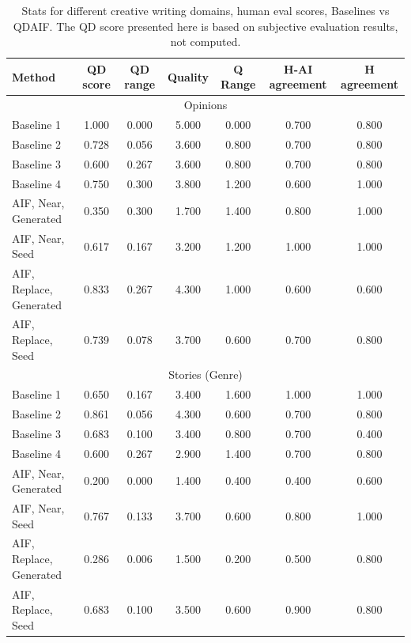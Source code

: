 \begin{table}[!t]
\caption{ Stats for different creative writing domains, human eval scores, Baselines vs QDAIF. The QD score presented here is based on subjective evaluation results, not computed. }
\label{table:human_eval_baselines_vs_aif}
\centering
\small
\begin{tabular}{lcccccc}
\toprule
\textbf{Method} &
\textbf{QD score} & \textbf{QD range} & \textbf{Quality} & \textbf{Q Range} & \textbf{H-AI agreement} & \textbf{H agreement }  \\
\midrule
\multicolumn{7}{c}{Opinions} \\
\midrule
Baseline 1 & 1.000 & 0.000 & 5.000 & 0.000 & 0.700 & 0.800  \\ 
Baseline 2 & 0.728 & 0.056 & 3.600 & 0.800 & 0.700 & 0.800  \\ 
Baseline 3 & 0.600 & 0.267 & 3.600 & 0.800 & 0.700 & 0.800  \\ 
Baseline 4 & 0.750 & 0.300 & 3.800 & 1.200 & 0.600 & 1.000  \\ 
AIF, Near, Generated & 0.350 & 0.300 & 1.700 & 1.400 & 0.800 & 1.000  \\ 
AIF, Near, Seed & 0.617 & 0.167 & 3.200 & 1.200 & 1.000 & 1.000  \\ 
AIF, Replace, Generated & 0.833 & 0.267 & 4.300 & 1.000 & 0.600 & 0.600  \\ 
AIF, Replace, Seed & 0.739 & 0.078 & 3.700 & 0.600 & 0.700 & 0.800 \\ 
\midrule
\multicolumn{7}{c}{Stories (Genre)} \\
\midrule
Baseline 1 & 0.650 & 0.167 & 3.400 & 1.600 & 1.000 & 1.000  \\ 
Baseline 2 & 0.861 & 0.056 & 4.300 & 0.600 & 0.700 & 0.800  \\ 
Baseline 3 & 0.683 & 0.100 & 3.400 & 0.800 & 0.700 & 0.400  \\ 
Baseline 4 & 0.600 & 0.267 & 2.900 & 1.400 & 0.700 & 0.800  \\ 
AIF, Near, Generated & 0.200 & 0.000 & 1.400 & 0.400 & 0.400 & 0.600  \\ 
AIF, Near, Seed & 0.767 & 0.133 & 3.700 & 0.600 & 0.800 & 1.000  \\ 
AIF, Replace, Generated & 0.286 & 0.006 & 1.500 & 0.200 & 0.500 & 0.800  \\ 
AIF, Replace, Seed & 0.683 & 0.100 & 3.500 & 0.600 & 0.900 & 0.800 \\ 

\end{tabular}
\end{table}
